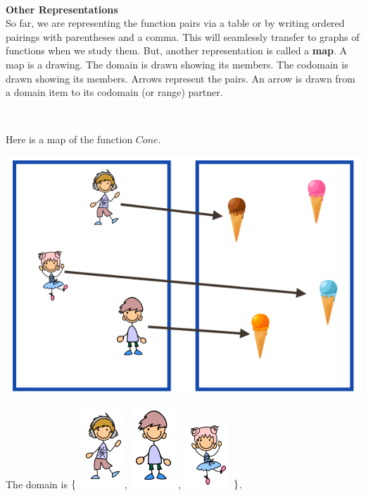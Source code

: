 \documentclass{ximera}
\begin{document}
\quad \\

\textbf{Other Representations} \\
So far, we are representing the function pairs via a table or by writing ordered pairings with parentheses and a comma.  This will seamlessly transfer to graphs of functions when we study them.  But, another representation is called a \textbf{map}.  A map is a drawing.  The domain is drawn showing its members. The codomain is drawn showing its members. Arrows represent the pairs.  An arrow is drawn from a domain item to its codomain (or range) partner.

\quad \\


\begin{example}
Here is a map of the function $Cone$.

\begin{image}
\includegraphics{pics/f_20.png}
\end{image}


The domain is $\Huge{ \{ }$ \includegraphics{pics/d1.png}, \includegraphics{pics/d3.png}, \includegraphics{pics/d2.png} $\Huge{ \} }$.
\quad \\


\end{example}
\end{document}
